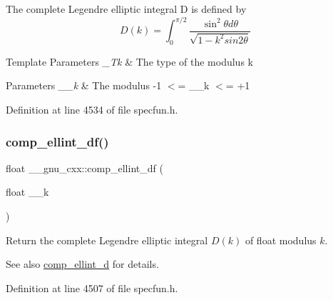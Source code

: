 The complete Legendre elliptic integral D is defined by \[ D(k) = \int_0^{\pi/2} \frac{\sin^2\theta d\theta}{\sqrt{1-k^2sin2\theta}} \]


\begin{DoxyTemplParams}{Template Parameters}
{\em \+\_\+\+Tk} & The type of the modulus {\ttfamily k} \\
\hline
\end{DoxyTemplParams}

\begin{DoxyParams}{Parameters}
{\em \+\_\+\+\_\+k} & The modulus {\ttfamily -\/1 $<$= \+\_\+\+\_\+k $<$= +1} \\
\hline
\end{DoxyParams}


Definition at line 4534 of file specfun.\+h.

\mbox{\label{group__gnu__math__spec__func_ga34ac6488b0e7531d5d4b7a8e31ff864e}} 
\subsubsection{\texorpdfstring{comp\+\_\+ellint\+\_\+df()}{comp\_ellint\_df()}}
{\footnotesize\ttfamily float \+\_\+\+\_\+gnu\+\_\+cxx\+::comp\+\_\+ellint\+\_\+df (\begin{DoxyParamCaption}\item[{float}]{\+\_\+\+\_\+k }\end{DoxyParamCaption})\hspace{0.3cm}{\ttfamily [inline]}}

Return the complete Legendre elliptic integral $ D(k) $ of {\ttfamily float} modulus $ k $.

\begin{DoxySeeAlso}{See also}
\hyperlink{group__gnu__math__spec__func_ga3fe79a91524b43ffc5ffb83c0eb2bd00}{comp\+\_\+ellint\+\_\+d} for details. 
\end{DoxySeeAlso}


Definition at line 4507 of file specfun.\+h.

\mbox{\label{group__gnu__math__spec__func_ga494931ec0a271b79f1fdcfdf929e3138}} 
